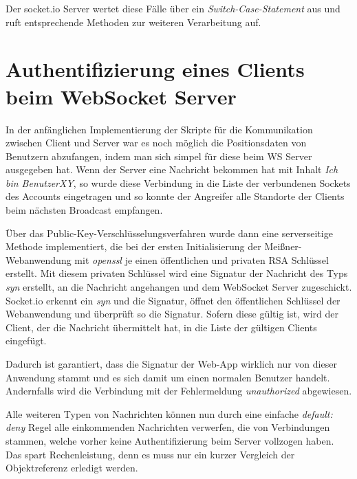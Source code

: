 Der socket.io Server wertet diese Fälle über ein \emph{Switch-Case-Statement} aus und ruft entsprechende Methoden zur weiteren Verarbeitung auf.

\section{Authentifizierung eines Clients beim WebSocket Server}
In der anfänglichen Implementierung der Skripte für die Kommunikation zwischen Client und Server war es noch möglich die Positionsdaten von Benutzern abzufangen, indem man sich simpel für diese beim WS Server ausgegeben hat. Wenn der Server eine Nachricht bekommen hat mit Inhalt \emph{Ich bin \glqq BenutzerXY\grqq{}}, so wurde diese Verbindung in die Liste der verbundenen Sockets des Accounts eingetragen und so konnte der \glqq Angreifer\grqq{} alle Standorte der Clients beim nächsten Broadcast empfangen.\par

Über das Public-Key-Verschlüsselungsverfahren wurde dann eine serverseitige Methode implementiert, die bei der ersten Initialisierung der Meißner-Webanwendung mit \emph{openssl} je einen öffentlichen und privaten RSA Schlüssel erstellt. Mit diesem privaten Schlüssel wird eine Signatur der Nachricht des Typs \emph{syn} erstellt, an die Nachricht angehangen und dem WebSocket Server zugeschickt.\\
Socket.io erkennt ein \emph{syn} und die Signatur, öffnet den öffentlichen Schlüssel der Webanwendung und überprüft so die Signatur. Sofern diese gültig ist, wird der Client, der die Nachricht übermittelt hat, in die Liste der gültigen Clients eingefügt.\par

Dadurch ist garantiert, dass die Signatur der Web-App wirklich nur von dieser Anwendung stammt und es sich damit um einen normalen Benutzer handelt. Andernfalls wird die Verbindung mit der Fehlermeldung \emph{unauthorized} abgewiesen.\par

Alle weiteren Typen von Nachrichten können nun durch eine einfache \emph{default: deny} Regel alle einkommenden Nachrichten verwerfen, die von Verbindungen stammen, welche vorher keine Authentifizierung beim Server vollzogen haben. Das spart Rechenleistung, denn es muss nur ein kurzer Vergleich der Objektreferenz erledigt werden.\par



